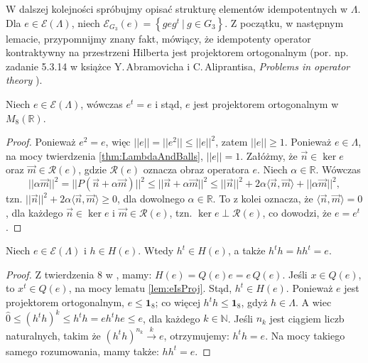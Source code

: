 {W dalszej kolejności spróbujmy opisać strukturę elementów idempotentnych w $\Lambda$.
Dla $e \in \mathcal{E}(\Lambda)$,
niech $\mathcal{E}_{G_{3}}(e) = \left \{ g e g^{t} \: | \: g \in G_{3} \right \}$.
Z początku, w następnym lemacie, przypomnijmy znany fakt,
mówiący, że idempotenty operator kontraktywny na przestrzeni Hilberta
jest projektorem ortogonalnym
(por. np. zadanie 5.3.14 w książce
Y.\,Abramovicha i  C.\,Aliprantisa,
\emph{Problems in operator theory}
\cite{Abramovich2002}).
\begin{Lemma}
    \label{lem:eIsProj}
    Niech $e \in \mathcal{E}(\Lambda)$, wówczas $e^{t} = e$ i stąd,
    $e$ jest projektorem ortogonalnym w $M_{8}(\mathbb{R})$.
\end{Lemma}
\begin{proof}
    Ponieważ $e^{2} = e$, więc $||e|| = ||e^{2}|| \leq ||e||^{2}$,
    zatem $||e|| \geq 1$.
    Ponieważ $e \in \Lambda$, na mocy twierdzenia \ref{thm:LambdaAndBalls},
    $||e|| =1$.
Załóżmy, że $\vec{n} \in \ker e$ oraz $\vec{m} \in \mathcal{R}(e)$,
gdzie $\mathcal{R}(e)$ oznacza obraz operatora $e$.
Niech $\alpha \in \mathbb{R}$.
Wówczas
\begin{equation}
    || \alpha \vec{m} ||^{2} = || P (\vec{n} + \alpha \vec{m}) ||^{2} \leq
    || \vec{n} + \alpha \vec{m}||^{2} \leq ||\vec{n}||^{2} +
        2 \alpha \langle \vec{n}, \vec{m} \rangle + || \alpha \vec{m}||^{2},
\end{equation}
tzn. $||\vec{n}||^{2} + 2 \alpha  \langle \vec{n}, \vec{m} \rangle \geq 0$,
dla dowolnego $\alpha \in \mathbb{R}$.
To z kolei oznacza, że
$\langle \vec{n}, \vec{m} \rangle = 0$,
dla każdego  $\vec{n} \in \ker e$ i $\vec{m} \in \mathcal{R}(e)$,
tzn.
$\ker e \perp \mathcal{R}(e)$, co dowodzi, że $e = e^{t}$.
\end{proof}

\begin{Theorem}
\label{prop:htranspose}
Niech $e \in \mathcal{E}(\Lambda)$ i $h \in H(e)$.
Wtedy $h^{t} \in H(e)$, a także $h^{t} h = h h^{t} = e$.
\end{Theorem}
\begin{proof}
    Z twierdzenia 8  w \cite{schwarz1955hausdorff}, mamy:
    $H(e) = Q(e) e = e \, Q(e)$.
Jeśli $x \in Q(e)$, to $x^{t} \in Q(e)$,
na mocy lematu \ref{lem:eIsProj}.
Stąd, $h^{t} \in H(e)$.
Ponieważ $e$ jest projektorem ortogonalnym, $e \leq \mathbf{1}_{8}$;
co więcej $h^{t} h \leq \mathbf{1}_{8}$, gdyż $h \in \Lambda$.
A wiec $\hat{0} \leq (h^{t} h)^{k} \leq h^{t} h = e h^{t} h e \leq e$,
dla każdego $k \in \mathbb{N}$.
Jeśli $n_{k}$ jest ciągiem liczb naturalnych, takim że
    $(h^{t} h)^{n_{k}} \overset{k}{\rightarrow} e$,
otrzymujemy: $h^{t} h = e$.
Na mocy takiego samego rozumowania, mamy także: $h h^{t} = e$.
\end{proof}

}
